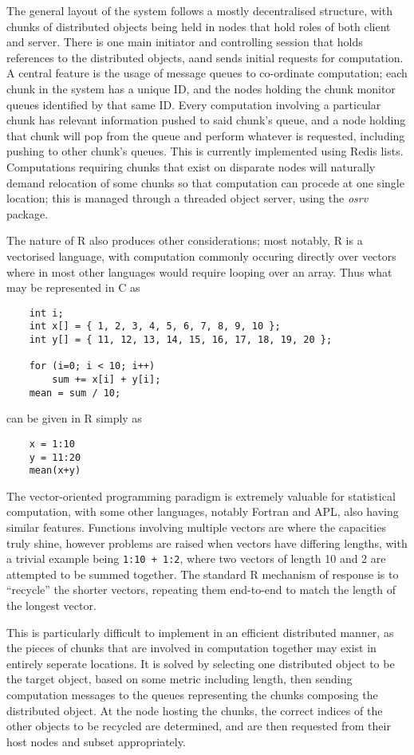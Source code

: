 \documentclass[a4paper,10pt]{article}
\begin{document}
The general layout of the system follows a mostly decentralised structure, with
chunks of distributed objects being held in nodes that hold roles of both
client and server.
There is one main initiator and controlling session that holds references to
the distributed objects, aand sends initial requests for computation.
A central feature is the usage of message queues to co-ordinate computation;
each chunk in the system has a unique ID, and the nodes holding the chunk
monitor queues identified by that same ID.
Every computation involving a particular chunk has relevant information pushed
to said chunk's queue, and a node holding that chunk will pop from the queue
and perform whatever is requested, including pushing to other chunk's queues.
This is currently implemented using Redis lists.
Computations requiring chunks that exist on disparate nodes will naturally
demand relocation of some chunks so that computation can procede at one single
location; this is managed through a threaded object server, using the
\textit{osrv} package\cite{urbanek2020osrv}.

The nature of R also produces other considerations; most notably, R is a
vectorised language, with computation commonly occuring directly over vectors
where in most other languages would require looping over an array.
Thus what may be represented in C as 
\begin{verbatim}
	int i;
	int x[] = { 1, 2, 3, 4, 5, 6, 7, 8, 9, 10 };
	int y[] = { 11, 12, 13, 14, 15, 16, 17, 18, 19, 20 };

	for (i=0; i < 10; i++)
		sum += x[i] + y[i]; 
	mean = sum / 10;
\end{verbatim}
can be given in R simply as
\begin{verbatim}
	x = 1:10
	y = 11:20
	mean(x+y)
\end{verbatim}
The vector-oriented programming paradigm is extremely valuable for statistical
computation, with some other languages, notably Fortran and APL, also having
similar features.
Functions involving multiple vectors are where the capacities truly shine,
however problems are raised when vectors have differing lengths, with a trivial
example being \texttt{1:10 + 1:2}, where two vectors of length 10 and 2
are attempted to be summed together.
The standard R mechanism of response is to ``recycle'' the shorter vectors,
repeating them end-to-end to match the length of the longest vector.

This is particularly difficult to implement in an efficient distributed manner,
as the pieces of chunks that are involved in computation together may exist in
entirely seperate locations.
It is solved by selecting one distributed object to be the target object, based
on some metric including length, then sending computation messages to the
queues representing the chunks composing the distributed object.
At the node hosting the chunks, the correct indices of the other objects to be
recycled are determined, and are then requested from their host nodes and
subset appropriately.
\end{document}
